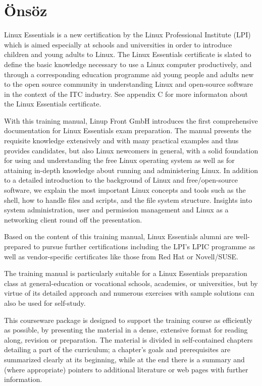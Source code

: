 \chapter*{Önsöz}

Linux Essentials is a new certification by the Linux Professional Institute (LPI) which is aimed especially at schools and universities in order to introduce children and young adults to Linux. The Linux Essentials certificate is slated to define the basic knowledge necessary to use a Linux computer productively, and through a corresponding education programme aid young people and adults new to the open source community in understanding Linux and open-source software in the context of the ITC industry. See appendix C for more informaton about the Linux Essentials certificate.

With this training manual, Linup Front GmbH introduces the first comprehensive documentation for Linux Essentials exam preparation. The manual presents the requisite knowledge extensively and with many practical examples and thus provides candidates, but also Linux newcomers in general, with a solid foundation for using and understanding the free Linux operating system as well as for attaining in-depth knowledge about running and administering Linux. In addition to a detailed introduction to the background of Linux and free/open-source software, we explain the most important Linux concepts and tools such as the shell, how to handle files and scripts, and the file system structure. Insights into system administration, user and permission management and Linux as a networking client round off the presentation.

Based on the content of this training manual, Linux Essentials alumni are well-prepared to pursue further certifications including the LPI’s LPIC programme as well as vendor-specific certificates like those from Red Hat or Novell/SUSE.

The training manual is particularly suitable for a Linux Essentials preparation class at general-education or vocational schools, academies, or universities, but by virtue of its detailed approach and numerous exercises with sample solutions can also be used for self-study.

This courseware package is designed to support the training course as efficiently as possible, by presenting the material in a dense, extensive format for reading along, revision or preparation. The material is divided in self-contained chapters detailing a part of the curriculum; a chapter’s goals and prerequisites are summarized clearly at its beginning, while at the end there is a summary and (where appropriate) pointers to additional literature or web pages with further information.

